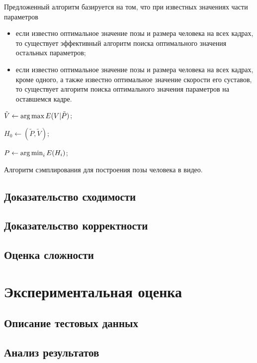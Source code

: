 Предложенный алгоритм базируется на том, что при известных значениях части параметров
\begin{itemize}
	\item если известно оптимальное значение позы и размера человека на всех кадрах, то существует эффективный алгоритм поиска оптимального значения остальных параметров;
	\item если известно оптимальное значение позы и размера человека на всех кадрах, кроме одного, а также известно оптимальное значение скорости его суставов, то существует алгоритм поиска оптимального значения параметров на оставшемся кадре.
\end{itemize}



\begin{algorithm}[H]
	\SetAlgoLined %
	
	
	
	$\tilde{V} \leftarrow \operatorname*{arg\,max}{E(V|\tilde{P})}$;
	
	$H_0 \leftarrow \left(\tilde{P}, \tilde{V} \right)$;
	

	$P \leftarrow \operatorname*{arg\,min}_i{E(H_i)}$;
	
	\caption{Алгоритм сэмплирования для построения позы человека в видео.}
	\label{alg:generalHM}
\end{algorithm}

\subsection{Доказательство сходимости}
\subsection{Доказательство корректности}
\subsection{Оценка сложности}
\section{Экспериментальная оценка}
\subsection{Описание тестовых данных}
\subsection{Анализ результатов}

